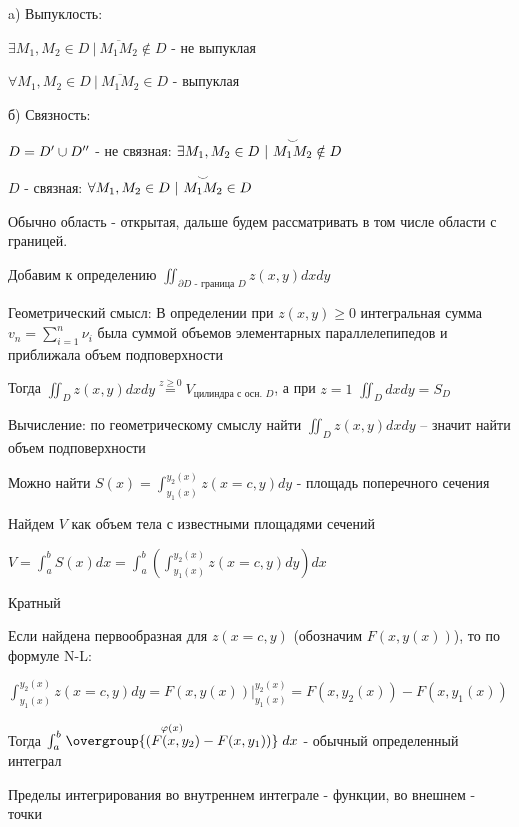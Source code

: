 \documentclass[12pt]{article}
\begin{document}
    a) Выпуклость:

    $\exists M_1, M_2 \in D \ | \ \overline{M_1 M_2} \notin D$ - не выпуклая

    $\forall M_1, M_2 \in D \ | \ \overline{M_1 M_2} \in D$ - выпуклая

    б) Связность:

    $D = D^\prime \cup D^{\prime\prime}$ - не связная: $\exists M_1, M_2 \in D \ | \ \overset{\LARGE\smile}{M_1 M_2} \notin D$

    $D$ - связная: $\forall M_1, M_2 \in D \ | \ \overset{\LARGE\smile}{M_1 M_2} \in D$

    Обычно область - открытая, дальше будем рассматривать в том числе области с границей.

    Добавим к определению $\iint_{\partial D \text{ - граница } D} z(x, y) dx dy$

    Геометрический смысл: В определении при $z(x, y) \geq 0$ интегральная сумма $v_n = \sum_{i=1}^n \nu_i$ была суммой объемов элементарных параллелепипедов и приближала объем подповерхности

    Тогда $\iint_D z(x, y) dx dy \stackrel{z \geq 0}{=} V_{\text{цилиндра с осн. } D}$, а при $z = 1$ $\iint_D dx dy = S_D$

    \hypertarget{doubleintegralcalculation}{}

    Вычисление: по геометрическому смыслу найти $\iint_D z(x, y) dx dy$ -- значит найти объем подповерхности

    Можно найти $S(x) = \int^{y_2(x)}_{y_1(x)} z(x = c, y) dy$ - площадь поперечного сечения

    Найдем $V$ как объем тела с известными площадями сечений

    $V = \int^b_a S(x) dx = \int_a^b \left(\int^{y_2(x)}_{y_1(x)} z(x = c, y) dy\right) dx$

    \hypertarget{multipleintegral}{}

    \Nota Кратный

    Если найдена первообразная для $z(x = c, y)$ (обозначим $F(x, y(x))$), то по формуле N-L:

    $\int^{y_2(x)}_{y_1(x)} z(x = c, y) dy = F(x, y(x)) \Big|^{y_2(x)}_{y_1(x)} = F(x, y_2(x)) - F(x, y_1(x))$

    Тогда $\int^b_a \stackrel{\varphi(x)}{\overgroup{(F(x, y_2) - F(x, y_1))}} dx$ - обычный определенный интеграл

    Пределы интегрирования во внутреннем интеграле - функции, во внешнем - точки
\end{document}

